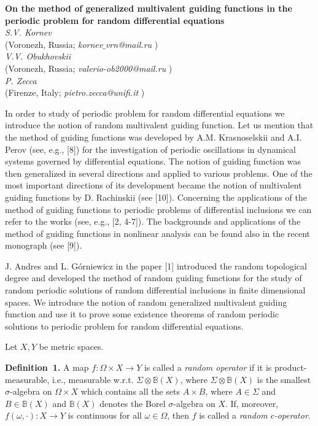 \begin{center}{ \bf  On the method of generalized multivalent guiding functions in the periodic problem for random differential equations }\\
{\it S.V. Kornev} \\
(Voronezh, Russia; {\it kornev$\_$vrn@mail.ru} )\\
{\it V.V. Obukhovskii} \\
(Voronezh, Russia; {\it valerio-ob2000@mail.ru} )\\
{\it P. Zecca} \\
(Firenze, Italy; {\it pietro.zecca@unifi.it} )\\
\end{center}

In order to study of periodic problem for random differential equations we introduce the notion of random multivalent guiding function. Let us mention that the method of guiding functions was developed by A.M. Krasnoselskii and A.I. Perov (see, e.g., [8]) for the investigation of periodic oscillations in dynamical systems governed by differential equations. The notion of guiding function was then generalized in several directions and applied to various problems. One of the most important directions of its development became the notion of multivalent guiding functions by D. Rachinskii (see [10]). Concerning the applications of the method of guiding functions to periodic problems of differential inclusions we can refer to the works (see, e.g., [2, 4-7]). The backgrounds and applications of the method of guiding functions in nonlinear analysis can be found also in the recent monograph (see [9]).

 J. Andres and L. G\'orniewicz in the paper [1] introduced the random topological degree and developed the method of random guiding functions for the study of random periodic solutions of random differential inclusions in finite dimensional spaces. We introduce the notion of random generalized multiva\-lent guiding function and use it to prove some existence theorems of random periodic solutions to periodic problem for random differential equations.

Let $X,Y$ be metric spaces.

\textbf{Definition~1.} A map $f\colon\Omega\times X\to Y$ is called a {\it random operator} if it is product-measurable, i.e., measurable w.r.t. $\Sigma\otimes\mathbb{B}(X)$, where $\Sigma\otimes\mathbb{B}(X)$ is the smallest $\sigma$-algebra on $\Omega\times X$ which contains all the sets $A\times B$, where $A\in\Sigma$ and $B\in\mathbb{B}(X)$ and $\mathbb{B}(X)$ denotes the Borel $\sigma$-algebra on $X$. If, moreover, $f(\omega,\cdot)\colon X\to Y$ is continuous for all $\omega\in\Omega$, then $f$ is called a {\it random $c$-operator}.

